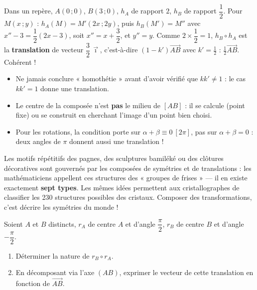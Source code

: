 \documentclass[11pt]{article}
\begin{document}
\begin{exemplebox}
Dans un repère, $A(0\,;0)$, $B(3\,;0)$, $h_A$ de rapport $2$, $h_B$ de rapport $\dfrac{1}{2}$. Pour $M(x\,;y)$ : $h_A(M) = M'(2x\,;2y)$, puis $h_B(M') = M''$ avec $x'' - 3 = \dfrac{1}{2}(2x-3)$, soit $x'' = x + \dfrac{3}{2}$, et $y'' = y$. Comme $2 \times \dfrac{1}{2} = 1$, $h_B \circ h_A$ est la \textbf{translation} de vecteur $\dfrac{3}{2}\,\vec{\imath}$, c'est-à-dire $(1-k')\overrightarrow{AB}$ avec $k' = \tfrac12$ : $\tfrac12 \overrightarrow{AB}$. Cohérent !
\end{exemplebox}

\begin{attention}
\begin{itemize}
  \item Ne jamais conclure « homothétie » avant d'avoir vérifié que $kk' \neq 1$ : le cas $kk' = 1$ donne une translation.
  \item Le centre de la composée n'est \textbf{pas} le milieu de $[AB]$ : il se calcule (point fixe) ou se construit en cherchant l'image d'un point bien choisi.
  \item Pour les rotations, la condition porte sur $\alpha + \beta \equiv 0 \ [2\pi]$, pas sur $\alpha + \beta = 0$ : deux angles de $\pi$ donnent aussi une translation !
\end{itemize}
\end{attention}

\begin{savaistu}
Les motifs répétitifs des pagnes, des sculptures bamiléké ou des clôtures décoratives sont gouvernés par les composées de symétries et de translations : les mathématiciens appellent ces structures des « groupes de frises » — il en existe exactement \textbf{sept types}. Les mêmes idées permettent aux cristallographes de classifier les 230 structures possibles des cristaux. Composer des transformations, c'est décrire les symétries du monde !
\end{savaistu}

\begin{exercice}
Soient $A$ et $B$ distincts, $r_A$ de centre $A$ et d'angle $\dfrac{\pi}{2}$, $r_B$ de centre $B$ et d'angle $-\dfrac{\pi}{2}$.
\begin{enumerate}
  \item Déterminer la nature de $r_B \circ r_A$.
  \item En décomposant via l'axe $(AB)$, exprimer le vecteur de cette translation en fonction de $\overrightarrow{AB}$.
\end{enumerate}
\end{exercice}
\end{document}
